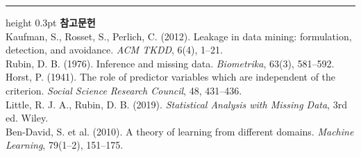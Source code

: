 \documentclass[10pt]{article}
\begin{document}
\vspace{0.6em}
\hrule height 0.3pt
\vspace{0.5em}
{\footnotesize
\textbf{참고문헌}\\[0.3em]
Kaufman, S., Rosset, S., Perlich, C. (2012). Leakage in data mining:
formulation, detection, and avoidance. \emph{ACM TKDD}, 6(4), 1--21.\\[0.15em]
Rubin, D. B. (1976). Inference and missing data. \emph{Biometrika}, 63(3), 581--592.\\[0.15em]
Horst, P. (1941). The role of predictor variables which are independent of the
criterion. \emph{Social Science Research Council}, 48, 431--436.\\[0.15em]
Little, R. J. A., Rubin, D. B. (2019). \emph{Statistical Analysis with Missing
Data}, 3rd ed. Wiley.\\[0.15em]
Ben-David, S. et al. (2010). A theory of learning from different domains.
\emph{Machine Learning}, 79(1--2), 151--175.
}
\end{document}
